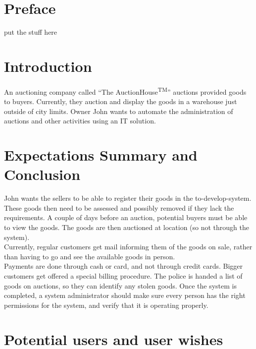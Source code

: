 \section{Preface}
put the stuff here

\section{Introduction}
An auctioning company called ``The AuctionHouse\textsuperscript{TM}'' auctions provided goods to buyers. Currently, they auction and display the goods in a warehouse just outside of city limits. Owner John wants to automate the administration of auctions and other activities using an IT solution.

\section{Expectations Summary and Conclusion}
John wants the sellers to be able to register their goods in the to-develop-system. These goods then need to be assessed and possibly removed if they lack the requirements. A couple of days before an auction, potential buyers must be able to view the goods. The goods are then auctioned at location (so not through the system).\\
Currently, regular customers get mail informing them of the goods on sale, rather than having to go and see the available goods in person.\\
Payments are done through cash or card, and not through credit cards. Bigger customers get offered a special billing procedure.
The police is handed a list of goods on auctions, so they can identify any stolen goods.
Once the system is completed, a system administrator should make sure every person has the right permissions for the system, and verify that it is operating properly.

\section{Potential users and user wishes}
